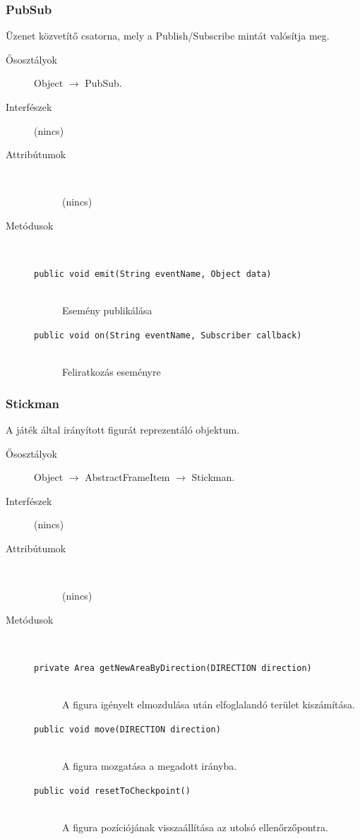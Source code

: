 		\subsubsection{PubSub}
				 Üzenet közvetítő csatorna, mely a Publish/Subscribe mintát valósítja meg. 			\begin{description}


				\item[Ősosztályok] Object $\rightarrow{}$ PubSub.
				\item[Interfészek] (nincs)
				\item[Attribútumok]$\ $
					\begin{description}
						\item[] (nincs)
					\end{description}
				\item[Metódusok]$\ $
					\begin{description}
						\item[\texttt{public void emit(String eventName, Object data)}] \hfill \\ Esemény publikálása 
						\item[\texttt{public void on(String eventName, Subscriber callback)}] \hfill \\ Feliratkozás eseményre 
					\end{description}
			\end{description}

		\subsubsection{Stickman}
				 A játék által irányított figurát reprezentáló objektum. 			\begin{description}


				\item[Ősosztályok] Object $\rightarrow{}$ AbstractFrameItem $\rightarrow{}$ Stickman.
				\item[Interfészek] (nincs)
				\item[Attribútumok]$\ $
					\begin{description}
						\item[] (nincs)
					\end{description}
				\item[Metódusok]$\ $
					\begin{description}
						\item[\texttt{private Area getNewAreaByDirection(DIRECTION direction)}] \hfill \\ A figura igényelt elmozdulása után elfoglalandó  terület kiszámítása. 
						\item[\texttt{public void move(DIRECTION direction)}] \hfill \\ A figura mozgatása a megadott irányba. 
						\item[\texttt{public void resetToCheckpoint()}] \hfill \\ A figura pozíciójának visszaállítása az  utolsó ellenőrzőpontra. 
					\end{description}
			\end{description}

